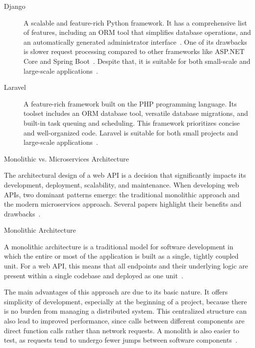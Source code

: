 \documentclass[12pt,reqno, oneside]{amsbook}
\makeatletter
\def\section{\@startsection{section}{1}%
      \z@{.5\linespacing\@plus.7\linespacing}{.25\linespacing}%
      {\normalfont\bfseries\flushleft}}
\def\subsection{\@startsection{subsection}{2}%
      \z@{.5\linespacing\@plus.7\linespacing}{.25\linespacing}%
      {\normalfont\bfseries\flushleft}}
\theoremstyle{definition}
\theoremstyle{definition}
\numberwithin{section}{chapter}
\numberwithin{table}{chapter}
\numberwithin{figure}{chapter}
\makeatother
\begin{document}
\begin{description}
  \item [Django] A scalable and feature-rich Python framework. It has a comprehensive list of features, including an \ac{ORM} tool that simplifies database operations, and an automatically generated administrator interface~\cite{Mozilla, Zanevych2024, Chen2017}. One of its drawbacks is slower request processing compared to other frameworks like ASP.NET Core and Spring Boot~\cite{Haque2022, Choma2023}. Despite that, it is suitable for both small-scale and large-scale applications~\cite{Mozilla, Zanevych2024}.
  \item [Laravel] A feature-rich framework built on the PHP programming language. Its toolset includes an \ac{ORM} database tool, versatile database migrations, and built-in task queuing and scheduling. This framework prioritizes concise and well-organized code. Laravel is suitable for both small projects and large-scale applications~\cite{Mozilla, Madurapperuma2022, Nguyen2022}.
\end{description}

\pagebreak

\section{Monolithic vs. Microservices Architecture}
\label{Section:Monolithic_vs_Microservices_Architecture}

The architectural design of a web \ac{API} is a decision that significantly impacts its development, deployment, scalability, and maintenance. When developing web \acp{API}, two dominant patterns emerge: the traditional monolithic approach and the modern microservices approach. Several papers highlight their benefits and drawbacks~\cite{Huf2019, Taibi2018, Adrio2023, Moysiadis2022}.

\subsection{Monolithic Architecture}
\label{Subsection:Monolithic_Architecture}

A monolithic architecture is a traditional model for software development in which the entire or most of the application is built as a single, tightly coupled unit. For a web \ac{API}, this means that all endpoints and their underlying logic are present within a single codebase and deployed as one unit~\cite{Taibi2018, Adrio2023, Moysiadis2022, Figueira2024, Kenan2020, Yoo2025}.

The main advantages of this approach are due to its basic nature. It offers simplicity of development, especially at the beginning of a project, because there is no burden from managing a distributed system. This centralized structure can also lead to improved performance, since calls between different components are direct function calls rather than network requests. A monolith is also easier to test, as requests tend to undergo fewer jumps between software components~\cite{Taibi2018, Adrio2023, Moysiadis2022, Figueira2024, Kenan2020, Blinowski2022}.
\end{document}
